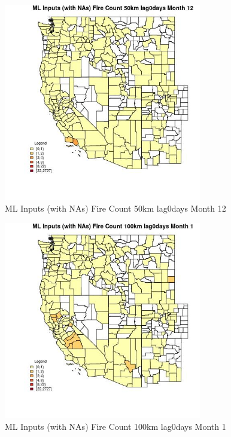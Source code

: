 \begin{figure} 
\centering  
\includegraphics[width=0.77\textwidth]{Code_Outputs/Report_ML_input_PM25_Step4_part_f_de_duplicated_aveswNAs_CountyFire_Count_50km_lag0daysmedianMonth12.jpg} 
\caption{\label{fig:Report_ML_input_PM25_Step4_part_f_de_duplicated_aveswNAsCountyFire_Count_50km_lag0daysmedianMonth12}ML Inputs (with NAs) Fire Count 50km lag0days Month 12} 
\end{figure} 
 

\begin{figure} 
\centering  
\includegraphics[width=0.77\textwidth]{Code_Outputs/Report_ML_input_PM25_Step4_part_f_de_duplicated_aveswNAs_CountyFire_Count_100km_lag0daysmedianMonth1.jpg} 
\caption{\label{fig:Report_ML_input_PM25_Step4_part_f_de_duplicated_aveswNAsCountyFire_Count_100km_lag0daysmedianMonth1}ML Inputs (with NAs) Fire Count 100km lag0days Month 1} 
\end{figure} 
 

